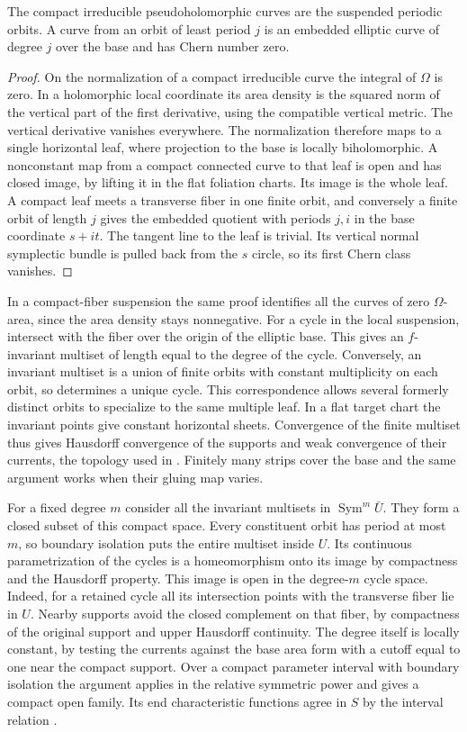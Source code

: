 \begin{lemma}\label{lem:sheets}
The compact irreducible pseudoholomorphic curves are the suspended
periodic orbits. A curve from an orbit of least period $j$ is an embedded
elliptic curve of degree $j$ over the base and has Chern number zero.
\end{lemma}
\begin{proof}
On the normalization of a compact irreducible curve the integral of
$\Omega$ is zero. In a holomorphic local coordinate its area density is
the squared norm of the vertical part of the first derivative, using the
compatible vertical metric. The vertical derivative vanishes everywhere.
The normalization therefore maps to a single horizontal leaf, where
projection to the base is locally biholomorphic. A nonconstant map from
a compact connected curve to that leaf is open and has closed image, by
lifting it in the flat foliation charts. Its image is the whole leaf.
A compact leaf meets a transverse fiber in one finite orbit, and
conversely a finite orbit of length $j$ gives the embedded quotient with
periods $j,i$ in the base coordinate $s+it$. The tangent line to the
leaf is trivial. Its vertical normal symplectic bundle is pulled back
from the $s$ circle, so its first Chern class vanishes.
\end{proof}

In a compact-fiber suspension the same proof identifies all the curves
of zero $\Omega$-area, since the area density stays nonnegative.
For a cycle in the local suspension, intersect with the fiber over the
origin of the elliptic base. This gives an $f$-invariant multiset of
length equal to the degree of the cycle. Conversely, an invariant
multiset is a union of finite orbits with constant multiplicity on
each orbit, so determines a unique cycle. This correspondence allows
several formerly distinct orbits to specialize to the same multiple
leaf. In a flat target chart the invariant points give constant
horizontal sheets. Convergence of the finite multiset thus gives
Hausdorff convergence of the supports and weak convergence of their
currents, the topology used in \cite[\S2]{WueProduct}. Finitely many strips
cover the base and the same argument works when their gluing map varies.

For a fixed degree $m$ consider all the invariant multisets in
$\operatorname{Sym}^m\bar U$. They form a closed subset of this compact
space. Every constituent orbit has period at most $m$, so boundary
isolation puts the entire multiset inside $U$. Its continuous
parametrization of the cycles is a homeomorphism onto its image by
compactness and the Hausdorff property. This image is open in the
degree-$m$ cycle space. Indeed, for a retained cycle all its intersection
points with the transverse fiber lie in $U$. Nearby supports avoid the
closed complement on that fiber, by compactness of the original
support and upper Hausdorff continuity. The degree itself is locally
constant, by testing the currents against the base area form with a
cutoff equal to one near the compact support. Over a compact parameter
interval with boundary isolation the argument applies in the relative
symmetric power and gives a compact open family. Its end characteristic
functions agree in $S$ by the interval relation \cite[\S2]{WueProduct}.

